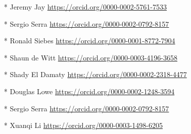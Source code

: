 \documentclass[ds,v1.1.2,openaccess]{iosart2x}%
\begin{document}
\begin{appendix}
\begin{itemize}
\item[*] Jeremy Jay \url{https://orcid.org/0000-0002-5761-7533}
\item[*] Sergio Serra \url{https://orcid.org/0000-0002-0792-8157}
\item[*] Ronald Siebes \url{https://orcid.org/0000-0001-8772-7904}
\item[*] Shaun de Witt \url{https://orcid.org/0000-0003-4196-3658}
\item[*] Shady El Damaty \url{https://orcid.org/0000-0002-2318-4477}
\item[*] Douglas Lowe \url{https://orcid.org/0000-0002-1248-3594}
\item[*] Sergio Serra \url{https://orcid.org/0000-0002-0792-8157}
\item[*] Xuanqi Li \url{https://orcid.org/0000-0003-1498-6205}
\end{itemize}
\end{appendix}
\end{document}
